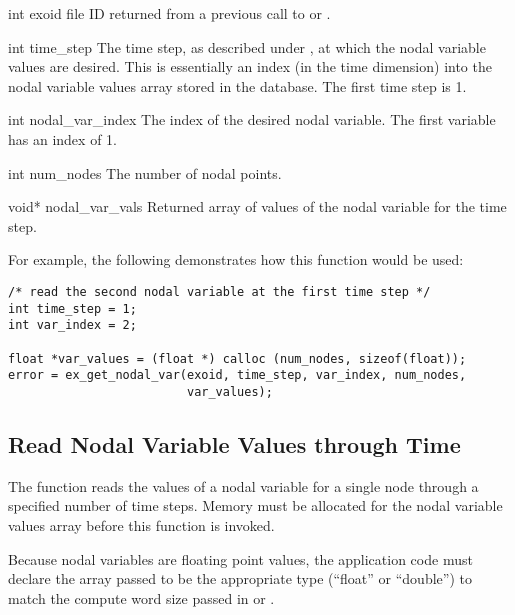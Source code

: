 \begin{parameters}
\item[{int exoid \R{}}]
\exo{} file ID returned from a previous call to 
or .

\item[{int time_step \R{}}]
The time step, as described under , at which the
nodal variable values are desired. This is essentially an index (in
the time dimension) into the nodal variable values array stored in the
database. The first time step is 1.

\item[{int nodal_var_index \R{}}]
The index of the desired nodal variable. The first variable
has an index of 1.

\item[{int num_nodes \R{}}]
The number of nodal points.

\item[{void* nodal_var_vals \W{}}]
Returned array of  values of the \th{}
nodal variable for the \th{} time step.
\end{parameters}

For example, the following demonstrates how this function would be
used:

\begin{lstlisting}
/* read the second nodal variable at the first time step */
int time_step = 1;
int var_index = 2;

float *var_values = (float *) calloc (num_nodes, sizeof(float));
error = ex_get_nodal_var(exoid, time_step, var_index, num_nodes,
                         var_values);
\end{lstlisting}


\subsection{Read Nodal Variable Values through Time}

The function  reads the values of a
nodal variable for a single node through a specified number of time
steps. Memory must be allocated for the nodal variable values array
before this function is invoked.

Because nodal variables are floating point values, the application
code must declare the array passed to be the appropriate type
(``float'' or ``double'') to match the compute word size passed
in  or .

